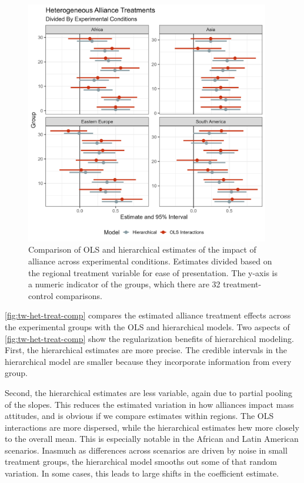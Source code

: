 \documentclass[12pt]{article}
\begin{document}
\begin{figure}[htpb]
	\centering
		\includegraphics[width=0.95\textwidth]{../figures/tw-het-treat-comp.png}
	\caption{Comparison of OLS and hierarchical estimates of the impact of alliance across experimental conditions. Estimates divided based on the regional treatment variable for ease of presentation. The y-axis is a numeric indicator of the groups, which there are 32 treatment-control comparisons.}
	\label{fig:tw-het-treat-comp}
\end{figure}


\autoref{fig:tw-het-treat-comp} compares the estimated alliance treatment effects across the experimental groups with the OLS and hierarchical models.
Two aspects of \autoref{fig:tw-het-treat-comp} show the regularization benefits of hierarchical modeling.
First, the hierarchical estimates are more precise. 
The credible intervals in the hierarchical model are smaller because they incorporate information from every group. 


Second, the hierarchical estimates are less variable, again due to partial pooling of the slopes.
This reduces the estimated variation in how alliances impact mass attitudes, and is obvious if we compare estimates within regions. 
The OLS interactions are more dispersed, while the hierarchical estimates hew more closely to the overall mean.
This is especially notable in the African and Latin American scenarios. 
Inasmuch as differences across scenarios are driven by noise in small treatment groups, the hierarchical model smooths out some of that random variation.
In some cases, this leads to large shifts in the coefficient estimate.
\end{document}
